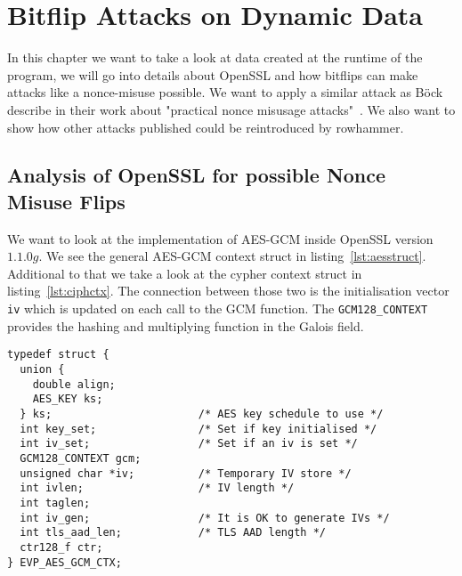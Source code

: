 \chapter{Bitflip Attacks on Dynamic Data}\label{sec:automate}

In this chapter we want to take a look at data created at the runtime of the
program, we will go into details about OpenSSL and how bitflips can make attacks
like a nonce-misuse possible. We want to apply a similar attack as Böck~\etal
describe in their work about "practical nonce misusage
attacks"~\cite{gcmnonceattack}. We also want to show how other attacks published
could be reintroduced by rowhammer.

\section{Analysis of OpenSSL for possible Nonce Misuse Flips}

We want to look at the implementation of AES-GCM inside OpenSSL version
$1.1.0g$. We see the general AES-GCM context struct in
listing~\ref{lst:aesstruct}. Additional to that we take a look at the cypher
context struct in listing~\ref{lst:ciphctx}. The connection between those two is
the initialisation vector \texttt{iv} which is updated on each call to the GCM
function. The \texttt{GCM128\_CONTEXT} provides the hashing and multiplying
function in the Galois field.

\begin{minipage}{\linewidth}
\begin{lstlisting}[style=CStyle,
                   caption={Struct used by OpenSSL to describe the AES-GCM
context. The IV used is stored in the memory pointed to by \texttt{iv}. Source
is taken from OpenSSL version $1.1.0g$},
                   label={lst:aesstruct}]
typedef struct {
  union {
    double align;
    AES_KEY ks;
  } ks;                       /* AES key schedule to use */
  int key_set;                /* Set if key initialised */
  int iv_set;                 /* Set if an iv is set */
  GCM128_CONTEXT gcm;
  unsigned char *iv;          /* Temporary IV store */
  int ivlen;                  /* IV length */
  int taglen;
  int iv_gen;                 /* It is OK to generate IVs */
  int tls_aad_len;            /* TLS AAD length */
  ctr128_f ctr;
} EVP_AES_GCM_CTX;
\end{lstlisting}
\end{minipage}

